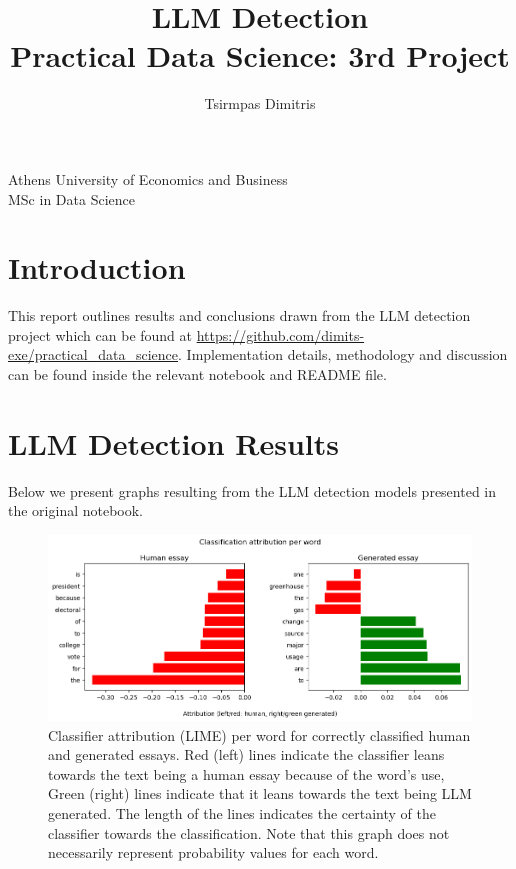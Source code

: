 \documentclass[11pt, a4paper]{article}
\title{\Huge LLM Detection\\
	\LARGE Practical Data Science: 3rd Project}
\author{\Large  Tsirmpas Dimitris }
\begin{document}
	
	\maketitle
	\begin{center}
		\large Athens University of Economics and Business \\
		\large MSc in Data Science
		
	\end{center}
	
	
	\section{Introduction}
	This report outlines results and conclusions drawn from the LLM detection project which can be found at \url{https://github.com/dimits-exe/practical_data_science}. Implementation details, methodology and discussion can be found inside the relevant notebook and README file.
	
	
	
	\section{LLM Detection Results}
	
	Below we present graphs resulting from the LLM detection models presented in the original notebook.
	
	\begin{figure}
		\includegraphics[width=14cm]{attribution.png}
		\centering
		\caption{Classifier attribution (LIME) per word for correctly classified human and generated essays. Red (left) lines indicate the classifier leans towards the text being a human essay because of the word's use, Green (right) lines indicate that it leans towards the text being LLM generated. The length of the lines indicates the certainty of the classifier towards the classification. Note that this graph does not necessarily represent probability values for each word.}
		\label{fig::attribution}
	\end{figure}
	
\end{document}
